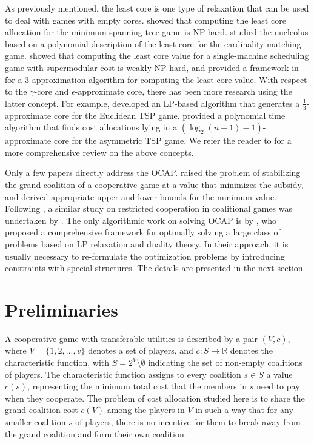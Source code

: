 \documentclass[ijoc,nonblindrev]{informs3} %
\begin{document}
As previously mentioned, the least core  is one type of relaxation that can be used to deal with games with empty cores.  \cite{faigle2000note} showed that computing the least core allocation for the minimum spanning tree game is NP-hard. \cite{Kern2003} studied the nucleolus based on a polynomial description of the least core for the cardinality matching game. \cite{Uhan2010} showed that computing the least core value for a single-machine scheduling game with supermodular cost is weakly NP-hard, and provided a framework in \cite{Uhan2013LeastCore} for a 3-approximation algorithm for computing the least core value.
With respect to  the $\gamma$-core and $\epsilon$-approximate core, there has been more research using the latter concept.  For example, \cite{Faigle1998EuclideanTSPGamesCore} developed an LP-based algorithm that generates a $\frac{1}{3}$-approximate core for the Euclidean TSP game. \cite{Blaser2008MetricTSPGamesCore} provided a polynomial time algorithm that finds cost allocations lying in a $(\log_2(n-1)-1)$-approximate core for the asymmetric TSP game.
We refer the reader to \cite{Jain2007CostSharing} for a more comprehensive review on the above concepts.

Only a few papers directly address the OCAP.
\cite{Bachrach2009Cost} raised the problem of stabilizing the grand coalition of a cooperative game at  a value that minimizes the subsidy, and derived appropriate upper and lower bounds for the minimum value.
Following \cite{Bachrach2009Cost}, a similar study on restricted cooperation in coalitional games was undertaken by \cite{Meir2011subsidies}. The only algorithmic  work on solving OCAP is by
\cite{Caprara2010LPB}, who proposed a comprehensive framework for optimally solving a large class of problems  based on LP relaxation and duality theory.
In their approach, it is usually necessary to re-formulate the optimization problems by introducing constraints with special structures. The details are presented in the next section.

\section{Preliminaries}\label{sec:definition}
A cooperative game with transferable utilities is described by a pair $(V,c)$, where $V = \{1,2,...,v\}$ denotes a set of players, and $c:S \rightarrow \mathbb{R}$ denotes the characteristic function, with $S= 2^V \setminus \emptyset$ indicating the set of non-empty coalitions of players.
The characteristic function assigns to every coalition $s\in S$ a value $c(s)$, representing the minimum total cost that the members in $s$ need to pay when they cooperate.
The problem of cost allocation studied here is to share the grand coalition cost $c(V)$ among the players in $V$ in such a way that for any smaller coalition $s$ of players, there is no incentive for them to break away from the grand coalition and form their own coalition.
\end{document}
